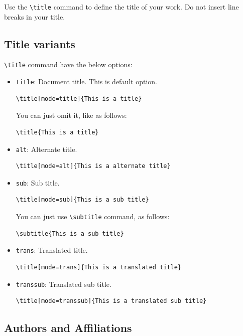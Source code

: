 \documentclass[
]{ceurart}
\begin{document}
Use the \verb|\title| command to define the title of your work. Do not
insert line breaks in your title.

\subsection{Title variants}

\verb|\title| command have the below options:
\begin{itemize}
  \item \verb|title|: Document title. This is default option.
        \begin{lstlisting}
\title[mode=title]{This is a title}
\end{lstlisting}
        You can just omit it, like as follows:
        \begin{lstlisting}
\title{This is a title}
\end{lstlisting}

  \item \verb|alt|: Alternate title.
        \begin{lstlisting}
\title[mode=alt]{This is a alternate title}
\end{lstlisting}

  \item \verb|sub|: Sub title.
        \begin{lstlisting}
\title[mode=sub]{This is a sub title}
\end{lstlisting}
        You can just use \verb|\subtitle| command, as follows:
        \begin{lstlisting}
\subtitle{This is a sub title}
\end{lstlisting}

  \item \verb|trans|: Translated title.
        \begin{lstlisting}
\title[mode=trans]{This is a translated title}
\end{lstlisting}

  \item \verb|transsub|: Translated sub title.
        \begin{lstlisting}
\title[mode=transsub]{This is a translated sub title}
\end{lstlisting}
\end{itemize}

\subsection{Authors and Affiliations}
\end{document}
